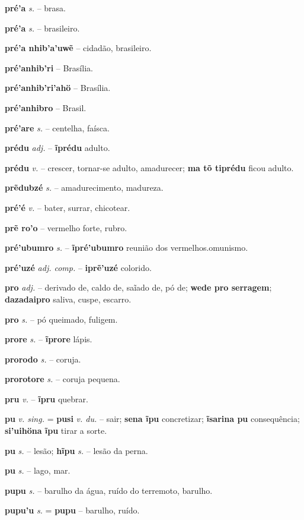 \textbf{pré'a} \textit{s.} -- brasa.

\textbf{pré'a} \textit{s.} -- brasileiro.

\textbf{pré'a nhib'a'uwẽ} \textit{} -- cidadão, brasileiro.

\textbf{pré'anhib'ri} \textit{} -- Brasília.

\textbf{pré'anhib'ri'ahö} \textit{} -- Brasília.

\textbf{pré'anhibro} \textit{} -- Brasil.

\textbf{pré'are} \textit{s.} -- centelha, faísca.

\textbf{prédu} \textit{adj.} -- \textbf{ĩprédu} adulto.

\textbf{prédu} \textit{v.} -- crescer, tornar-se adulto, amadurecer; \textbf{ma tõ tiprédu} ficou adulto.

\textbf{prẽdubzé} \textit{s.} -- amadurecimento, madureza.

\textbf{pré'é} \textit{v.} -- bater, surrar, chicotear.

\textbf{prẽ ro'o} -- vermelho forte, rubro.

\textbf{pré'ubumro} \textit{s.} -- \textbf{ĩpré'ubumro} reunião dos vermelhos.omunismo.

\textbf{pré'uzé} \textit{adj. comp.} -- \textbf{iprẽ'uzé} colorido.

\textbf{pro} \textit{adj.} -- derivado de, caldo de, saĩado de, pó de; \textbf{wede pro serragem}; \textbf{dazadaipro} saliva, cuspe, escarro.

\textbf{pro} \textit{s.} -- pó queimado, fuligem.

\textbf{prore} \textit{s.} -- \textbf{ĩprore} lápis.

\textbf{prorodo} \textit{s.} -- coruja.

\textbf{prorotore} \textit{s.} -- coruja pequena.

\textbf{pru} \textit{v.} -- \textbf{ĩpru} quebrar.

\textbf{pu} \textit{v. sing.} = \textbf{pusi} \textit{v. du.} -- sair; \textbf{sena ĩpu} concretizar; \textbf{ĩsarina pu} consequência; \textbf{si'uihöna ĩpu} tirar a sorte.

\textbf{pu} \textit{s.} -- lesão; \textbf{hĩpu} \textit{s.} -- lesão da perna.

\textbf{pu} \textit{s.} -- lago, mar.

\textbf{pupu} \textit{s.} -- barulho da água, ruído do terremoto, barulho.

\textbf{pupu'u} \textit{s.} = \textbf{pupu} -- barulho, ruído.

